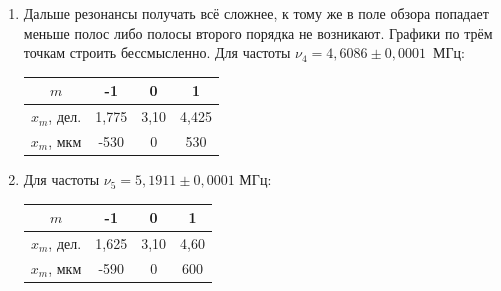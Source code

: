 \documentclass[a4paper,12pt]{article}
\begin{document}
\begin{enumerate}
	
	\item Дальше резонансы получать всё сложнее, к тому же в поле обзора попадает меньше полос либо полосы второго порядка не возникают. Графики по трём точкам строить бессмысленно. Для частоты $\nu_4=4{,}6086\pm 0{,}0001$~МГц:
	    \begin{center}
	    \begin{tabular}{|c|c|c|c|}
            \hline
            $m$ & -1 & 0 & 1 \\ \hline
            $x_m$, дел. & 1,775 & 3,10 & 4,425 \\ \hline
            $x_m$, мкм & -530 & 0 & 530 \\ \hline
        \end{tabular}
	    \end{center}
	\item Для частоты $\nu_5=5{,}1911\pm 0{,}0001$ МГц:
	    \begin{center}
	    \begin{tabular}{|c|c|c|c|}
            \hline
            $m$ & -1 & 0 & 1 \\ \hline
            $x_m$, дел. & 1,625 & 3,10 & 4,60 \\ \hline
            $x_m$, мкм & -590 & 0 & 600 \\ \hline
        \end{tabular}
	    \end{center}
	\end{enumerate}
\end{document}
